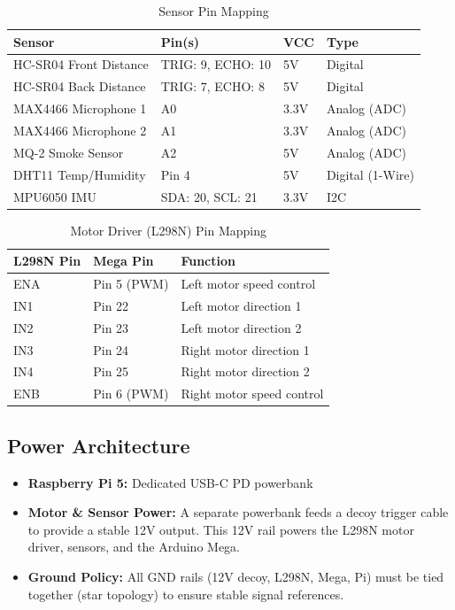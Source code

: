 \documentclass[11pt,a4paper]{article}
\begin{document}
\begin{table}[h]
\centering
\caption{Sensor Pin Mapping}
\label{tab:sensor-pins}
\begin{tabularx}{\textwidth}{l l l X}
\toprule
\textbf{Sensor} & \textbf{Pin(s)} & \textbf{VCC} & \textbf{Type} \\
\midrule
HC-SR04 Front Distance & TRIG: 9, ECHO: 10 & 5V & Digital \\
HC-SR04 Back Distance & TRIG: 7, ECHO: 8 & 5V & Digital \\
MAX4466 Microphone 1 & A0 & 3.3V & Analog (ADC) \\
MAX4466 Microphone 2 & A1 & 3.3V & Analog (ADC) \\
MQ-2 Smoke Sensor & A2 & 5V & Analog (ADC) \\
DHT11 Temp/Humidity & Pin 4 & 5V & Digital (1-Wire) \\
MPU6050 IMU & SDA: 20, SCL: 21 & 3.3V & I2C \\
\bottomrule
\end{tabularx}
\end{table}

\begin{table}[h]
\centering
\caption{Motor Driver (L298N) Pin Mapping}
\label{tab:motor-pins}
\begin{tabularx}{\textwidth}{l l X}
\toprule
\textbf{L298N Pin} & \textbf{Mega Pin} & \textbf{Function} \\
\midrule
ENA & Pin 5 (PWM) & Left motor speed control \\
IN1 & Pin 22 & Left motor direction 1 \\
IN2 & Pin 23 & Left motor direction 2 \\
IN3 & Pin 24 & Right motor direction 1 \\
IN4 & Pin 25 & Right motor direction 2 \\
ENB & Pin 6 (PWM) & Right motor speed control \\
\bottomrule
\end{tabularx}
\end{table}

\subsection{Power Architecture}
\begin{itemize}
    \item \textbf{Raspberry Pi 5:} Dedicated USB-C PD powerbank
    \item \textbf{Motor \& Sensor Power:} A separate powerbank feeds a decoy trigger cable to provide a stable 12V output. This 12V rail powers the L298N motor driver, sensors, and the Arduino Mega.
    \item \textbf{Ground Policy:} All GND rails (12V decoy, L298N, Mega, Pi) must be tied together (star topology) to ensure stable signal references.
\end{itemize}
\end{document}
